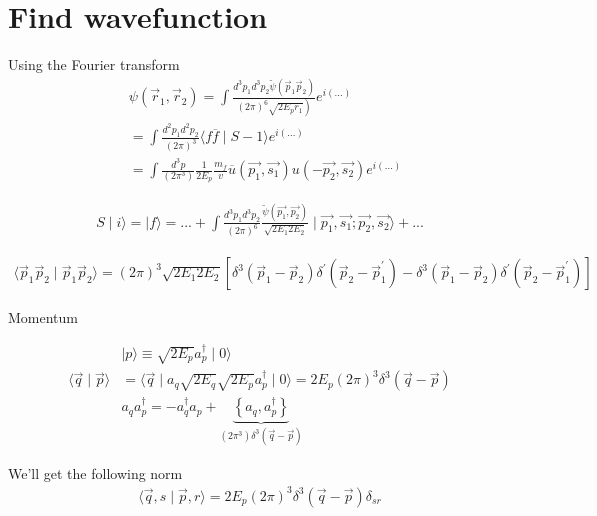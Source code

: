 \documentclass[12pt]{article}
\begin{document}
	\section{Find wavefunction}
	\indent Using the Fourier transform
	\[
	\begin{aligned}
		& \psi\left(\vec{r}_{1}, \vec{r}_{2}\right)=\int \frac{d^{3} p_{1} d^{3} p_{2} \widetilde{\psi}\left(\vec{p}_{1} \vec{p}_{2}\right)}{\left.(2 \pi)^{6} \sqrt{2 E_{p} r_{1}}\right) } e^{i(...)} \\
		& =\int \frac{d^{2} p_1 d^{2} p_2}{\left(2 \pi \right)^3 } \langle f \overline{f} \mid S-1\rangle e^{i(...)}\\
		& =\int \frac{d^{3}p}{(2 \pi^3)} \frac{1}{2 E_p} \frac{m_f}{v} \overline{u}(\vec{p_1},\vec{s_1}) u(-\vec{p_2},\vec{s_2}) e^{i(...)}
	\end{aligned}
	\]
	
	\[
	\begin{aligned}
		S \mid i \rangle = \mid f \rangle = ...+ \int \frac{d^3 p_1 d^3 p_2}{(2 \pi)^6} \frac{\widetilde{\psi}\left( \vec{p_1}, \vec{p_2}\right) }{\sqrt{2 E_1 2 E_2}} \mid \vec{p_1}, \vec{s_1}; \vec{p_2}, \vec{s_2} \rangle + ...
	\end{aligned}
	\]
	
	
	\[
	\begin{aligned}
		\langle \vec{p}_1 \vec{p}_2 \mid \vec{p}_1 \vec{p}_2 \rangle = (2 \pi)^3 \sqrt{2 E_1 2 E_2} \left[ \delta^{3}\left(\vec{p}_{1}-\vec{p}_{2}\right) \delta^{\prime}\left(\vec{p}_{2}-\vec{p}_{1}^{\prime}\right) - \delta^{3}\left(\vec{p}_{1}-\vec{p}_{2}\right) \delta^{\prime}\left(\vec{p}_{2}-\vec{p}_{1}^{\prime}\right) \right]
	\end{aligned}
	\]
	
	Momentum 
	
	\[
	\begin{aligned}
		&\mid p \rangle \equiv \sqrt{2 E_p} a_p^{\dagger} \mid 0 \rangle \\
		\langle \vec{q} \mid \vec{p} \rangle &= \langle \vec{q} \mid a_q \sqrt{2 E_q} \sqrt{2 E_p} a^{\dagger}_p \mid 0 \rangle = 2 E_p \left( 2 \pi \right)^3 \delta^3(\vec{q} - \vec{p}) \\
		&a_q a^{\dagger}_p = -a_q^{\dagger} a_p + \underbrace{\left\lbrace a_q, a^{\dagger}_p\right\rbrace }_{\left( 2 \pi^3\right) \delta^3 \left( \vec{q} - \vec{p}\right)  }
	\end{aligned}
	\]
	
	We'll get the following norm
	\[
	\begin{aligned}
		\langle \vec{q}, s \mid \vec{p}, r \rangle = 2 E_p \left(2 \pi \right)^3 \delta^3 \left( \vec{q} - \vec{p}\right) \delta_{sr}  
	\end{aligned}
	\]
	
\end{document}
